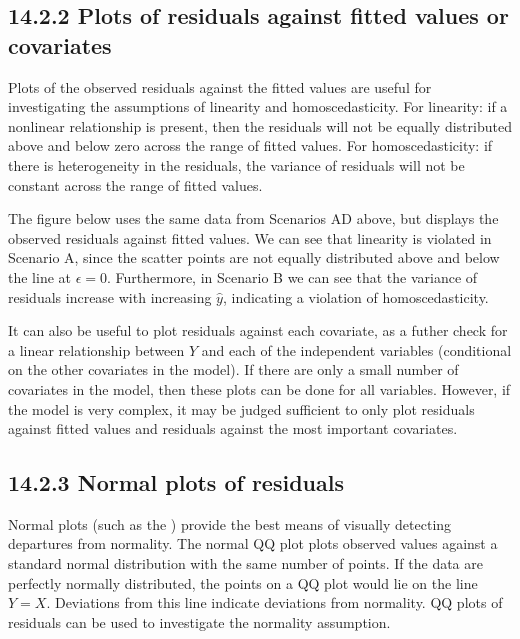 \documentclass[letterpaper,10pt,english]{jupyterBook}
\let\sphinxpxdimen\pdfpxdimen\else\newdimen\sphinxpxdimen
\begin{document}
\subsection{14.2.2  Plots of residuals against fitted values or covariates}
\label{\detokenize{14.c. Linear Regression III:plots-of-residuals-against-fitted-values-or-covariates}}
\sphinxAtStartPar
Plots of the observed residuals against the fitted values are useful for investigating the assumptions of linearity and homoscedasticity. For linearity: if a non\sphinxhyphen{}linear relationship is present, then the residuals will not be equally distributed above and below zero across the range of fitted values. For homoscedasticity: if there is heterogeneity in the residuals, the variance of residuals will not be constant across the range of fitted values.

\sphinxAtStartPar
The figure below uses the same data from Scenarios A\sphinxhyphen{}D above, but displays the observed residuals against fitted values. We can see that linearity is violated in Scenario A, since the scatter points are not equally distributed above and below the line at \(\epsilon=0\). Furthermore, in Scenario B we can see that the variance of residuals increase with increasing \(\hat{y}\), indicating a violation of homoscedasticity.

\begin{figure}[htbp]
\centering

\noindent\sphinxincludegraphics[height=600\sphinxpxdimen]{{residual_plots}.png}
\end{figure}

\sphinxAtStartPar
It can also be useful to plot residuals against each covariate, as a futher check for a linear relationship between \(Y\) and each of the independent variables (conditional on the other covariates in the model). If there are only a small number of covariates in the model, then these plots can be done for all variables. However, if the model is very complex, it may be judged sufficient to only plot residuals against fitted values and residuals against the most important covariates.


\subsection{14.2.3  Normal plots of residuals}
\label{\detokenize{14.c. Linear Regression III:normal-plots-of-residuals}}
\sphinxAtStartPar
Normal plots (such as the ) provide the best means of visually detecting departures from normality. The normal Q\sphinxhyphen{}Q plot plots observed values against a standard normal distribution with the same number of points. If the data are perfectly normally distributed, the points on a Q\sphinxhyphen{}Q plot would lie on the line \(Y=X\). Deviations from this line indicate deviations from normality. Q\sphinxhyphen{}Q plots of residuals can be used to investigate the normality assumption.
\end{document}
